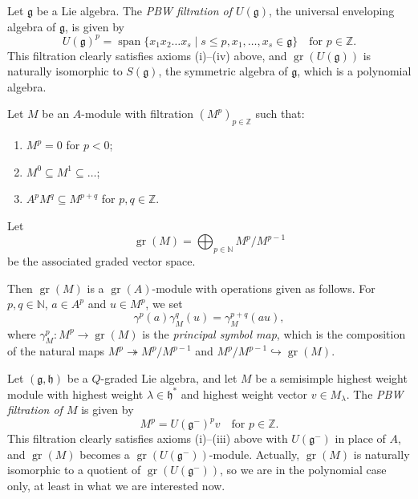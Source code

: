 \documentclass[a4paper, 12pt, reqno]{amsart}
\DeclareMathOperator{\gr}{gr}
\DeclareMathOperator{\vspan}{span}
\begin{document}
Let $\mathfrak{g}$ be a Lie algebra.
The \emph{PBW filtration of $U(\mathfrak{g})$}, the universal enveloping algebra of $\mathfrak{g}$, is given by
\begin{equation*}
  U(\mathfrak{g})^p = \vspan\{x_1x_2\dots x_s \mid s \le p, x_1, \dots, x_s \in \mathfrak{g}\} \quad \text{for $p \in \mathbb{Z}$}.
\end{equation*}
This filtration clearly satisfies axioms (i)--(iv) above, and $\gr(U(\mathfrak{g}))$ is naturally isomorphic to $S(\mathfrak{g})$, the symmetric algebra of $\mathfrak{g}$, which is a polynomial algebra.

Let $M$ be an $A$-module with filtration $(M^p)_{p \in \mathbb{Z}}$ such that:
\begin{enumerate}
\item $M^p = 0$ for $p < 0$;
\item $M^0 \subseteq M^1 \subseteq \dots$;
\item $A^pM^q \subseteq M^{p + q}$ for $p, q \in \mathbb{Z}$.
\end{enumerate}
Let
\begin{equation*}
  \gr(M) = \bigoplus_{p \in \mathbb{N}}M^p/M^{p - 1}
\end{equation*}
be the associated graded vector space.

Then $\gr(M)$ is a $\gr(A)$-module with operations given as follows.
For $p, q \in \mathbb{N}$, $a \in A^p$ and $u \in M^p$, we set
\begin{equation*}
  \gamma^p(a)\gamma^q_M(u) = \gamma^{p + q}_M(au),
\end{equation*}
where $\gamma^p_M: M^p \to \gr(M)$ is the \emph{principal symbol map}, which is the composition of the natural maps $M^p \twoheadrightarrow M^p/M^{p - 1}$ and $M^p/M^{p - 1} \hookrightarrow \gr(M)$.

Let $(\mathfrak{g}, \mathfrak{h})$ be a $Q$-graded Lie algebra, and let $M$ be a semisimple highest weight module with highest weight $\lambda \in \mathfrak{h}^*$ and highest weight vector $v \in M_{\lambda}$.
The \emph{PBW filtration of $M$} is given by
\begin{equation*}
  M^p = U(\mathfrak{g}^-)^pv \quad \text{for $p \in \mathbb{Z}$}.
\end{equation*}
This filtration clearly satisfies axioms (i)--(iii) above with $U(\mathfrak{g}^-)$ in place of $A$, and $\gr(M)$ becomes a $\gr(U(\mathfrak{g^-}))$-module.
Actually, $\gr(M)$ is naturally isomorphic to a quotient of $\gr(U(\mathfrak{g}^-))$, so we are in the polynomial case only, at least in what we are interested now.
\end{document}
